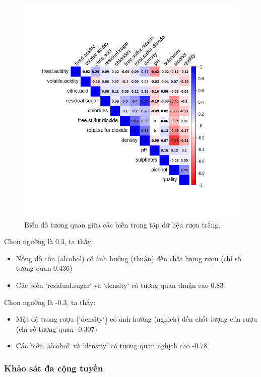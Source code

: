 \begin{figure}[H]
    \centering
    \includegraphics[width=0.75\columnwidth]{wine_figures/white_corr.png}
    \caption{Biểu đồ tương quan giữa các biến trong tập dữ liệu rượu trắng.}
    \label{fig:white_corr}
\end{figure}
Chọn ngưỡng là 0.3, ta thấy:
\begin{itemize}
    \item Nồng độ cồn (alcohol) có ảnh hưởng (thuận) đến chất lượng rượu (chỉ số tương quan 0.436)
    \item Các biến `residual.sugar` và `density` có tương quan thuận cao 0.83
\end{itemize}
Chọn ngưỡng là -0.3, ta thấy:
\begin{itemize}
    \item Mật độ trong rượu (`density`) có ảnh hưởng (nghịch) đến chất lượng của rượu (chỉ số tương quan -0.307)
    \item Các biến `alcohol` và `density` có tương quan nghịch cao -0.78
\end{itemize}

\subsubsection{Khảo sát đa cộng tuyến}

